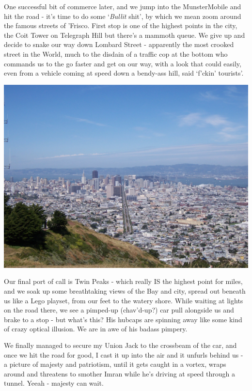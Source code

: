 \documentclass[a5paper,titlepage,11pt]{book}
\begin{document}
One successful bit of commerce later, and we jump into the MunsterMobile and hit the road - it's time to do some `\emph{Bullit} shit', by which we mean zoom around the famous streets of 'Frisco.  First stop is one of the highest points in the city, the Coit Tower on Telegraph Hill but there's a mammoth queue.  We give up and decide to snake our way down Lombard Street - apparently the most crooked street in the World, much to the disdain of a traffic cop at the bottom who commands us to the go faster and get on our way, with a look that could easily, even from a vehicle coming at speed down a bendy-ass hill, said `f'ckin' tourists'.

\begin{center}\includegraphics[width=\textwidth]{gfx/100_1168}\end{center}

Our final port of call is Twin Peaks - which really IS the highest point for miles, and we soak up some breathtaking views of the Bay and city, spread out beneath us like a Lego playset, from our feet to the watery shore.  While waiting at lights on the road there, we see a pimped-up (chav'd-up?) car pull alongside us and brake to a stop - but what's this?  His hubcaps are spinning away like some kind of crazy optical illusion.  We are in awe of his badass pimpery.

We finally managed to secure my Union Jack to the crossbeam of the car, and once we hit the road for good, I cast it up into the air and it unfurls behind us - a picture of majesty and patriotism, until it gets caught in a vortex, wraps around and threatens to smother Imran while he's driving at speed through a tunnel.  Yeeah - majesty can wait.
\end{document}
